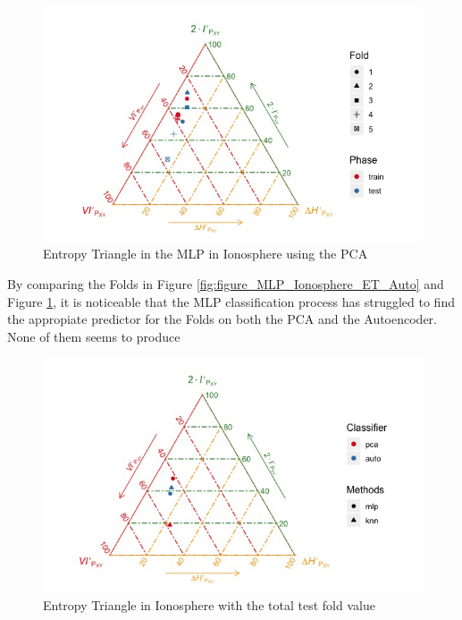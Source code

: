 \documentclass[12pt]{report}
\begin{document}
\begin{figure}[H]
	\centering
	\includegraphics[width=1\linewidth]{Figuras_tfg/ET_mlp_Ionosphere_pca}
	\caption{Entropy Triangle in the MLP in Ionosphere using the PCA}
	\label{fig:figure_MLP_Ionosphere_ET_PCA}
\end{figure}

By comparing the Folds in Figure \ref{fig:figure_MLP_Ionosphere_ET_Auto} and Figure \ref{fig:figure_MLP_Ionosphere_ET_PCA}, it is noticeable that the MLP classification process has struggled to find the appropiate predictor for the Folds on both the PCA and the Autoencoder. None of them seems to produce  
 


\begin{figure}[H]
	\centering
	\includegraphics[width=1\linewidth]{Figuras_tfg/ET_Total_Ionosphere}
	\caption{Entropy Triangle in Ionosphere with the total test fold value}
	\label{fig:figure_Total_Ionosphere_ET}
\end{figure}
\end{document}
